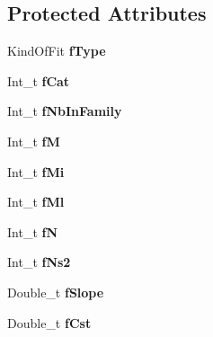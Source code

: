 \subsection*{Protected Attributes}
\begin{DoxyCompactItemize}
\item 
\hypertarget{classTSplineFit_a27ec9c874502a7d02f0933f797f633e5}{
KindOfFit {\bfseries fType}}
\label{classTSplineFit_a27ec9c874502a7d02f0933f797f633e5}

\item 
\hypertarget{classTSplineFit_a2e22ab428ef340225367d385bd1693c6}{
Int\_\-t {\bfseries fCat}}
\label{classTSplineFit_a2e22ab428ef340225367d385bd1693c6}

\item 
\hypertarget{classTSplineFit_abd1f65d49197fc36e46d5d441c8070bc}{
Int\_\-t {\bfseries fNbInFamily}}
\label{classTSplineFit_abd1f65d49197fc36e46d5d441c8070bc}

\item 
\hypertarget{classTSplineFit_a5f52174a10d63f789f9610932a1e2664}{
Int\_\-t {\bfseries fM}}
\label{classTSplineFit_a5f52174a10d63f789f9610932a1e2664}

\item 
\hypertarget{classTSplineFit_ae02d6f36802b3d4a9acead1e962f18b1}{
Int\_\-t {\bfseries fMi}}
\label{classTSplineFit_ae02d6f36802b3d4a9acead1e962f18b1}

\item 
\hypertarget{classTSplineFit_a8d87c94fd29545ca18672aa7528f2736}{
Int\_\-t {\bfseries fMl}}
\label{classTSplineFit_a8d87c94fd29545ca18672aa7528f2736}

\item 
\hypertarget{classTSplineFit_a60fd672ec09a2eb1568b76f6f86878a7}{
Int\_\-t {\bfseries fN}}
\label{classTSplineFit_a60fd672ec09a2eb1568b76f6f86878a7}

\item 
\hypertarget{classTSplineFit_a77af9837bc54fb6247f32c39ce7fb253}{
Int\_\-t {\bfseries fNs2}}
\label{classTSplineFit_a77af9837bc54fb6247f32c39ce7fb253}

\item 
\hypertarget{classTSplineFit_ad48530b722c5828efa51486145d14e0e}{
Double\_\-t {\bfseries fSlope}}
\label{classTSplineFit_ad48530b722c5828efa51486145d14e0e}

\item 
\hypertarget{classTSplineFit_ad1e03020cfbde1ddec5652c78b30ce47}{
Double\_\-t {\bfseries fCst}}
\label{classTSplineFit_ad1e03020cfbde1ddec5652c78b30ce47}


\end{DoxyCompactItemize}
